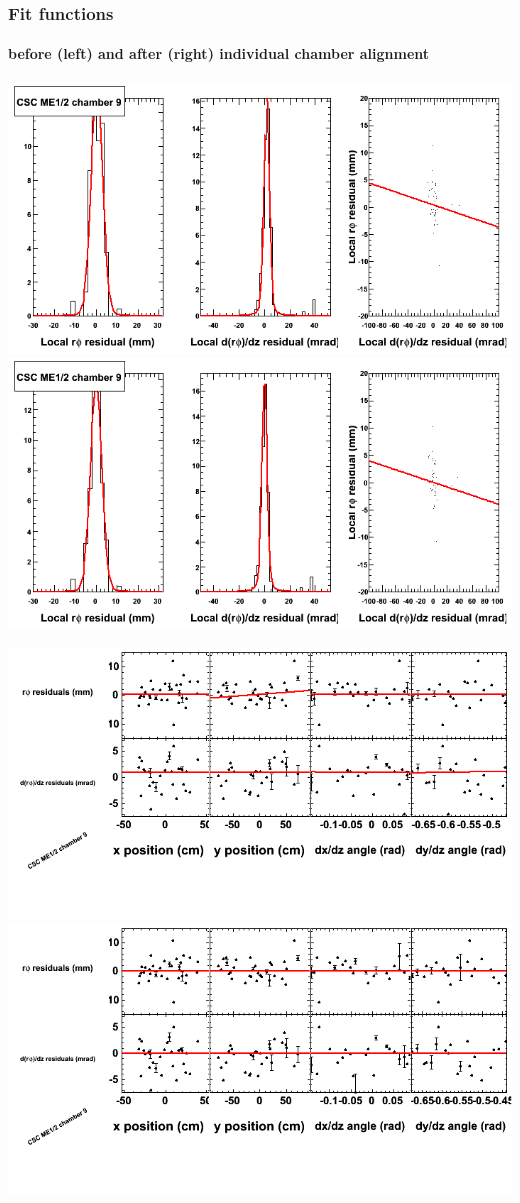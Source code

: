 \documentclass[compress]{beamer}
\begin{document}
\begin{frame}
\frametitle{Fit functions}
\framesubtitle{before (left) and after (right) individual chamber alignment}
\includegraphics[width=0.5\linewidth]{ringfits_3dof/beforefit_MEp12_09_bellcurve.png} \includegraphics[width=0.5\linewidth]{ringfits_3dof/afterfit_MEp12_09_bellcurve.png}

\includegraphics[width=0.5\linewidth]{ringfits_3dof/beforefit_MEp12_09_polynomials.png} \includegraphics[width=0.5\linewidth]{ringfits_3dof/afterfit_MEp12_09_polynomials.png}
\end{frame}
\end{document}
